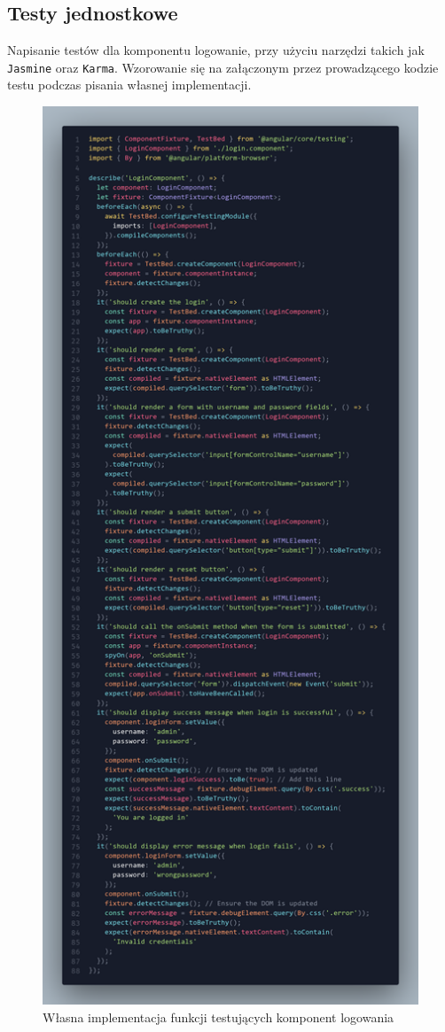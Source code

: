 \documentclass[12pt]{article}
\begin{document}
\pagebreak

\subsection{Testy jednostkowe}
\begin{description}[leftmargin=.5em]
  \item{Napisanie testów dla komponentu logowanie, przy użyciu narzędzi takich jak \texttt{Jasmine} oraz \texttt{Karma}}. Wzorowanie się na załączonym przez prowadzącego kodzie testu podczas pisania własnej implementacji.
\end{description}
\begin{figure}[H]
  \centering
  \includegraphics[height=0.79\textheight,keepaspectratio]{image-9.png}
  \caption{Własna implementacja funkcji testujących komponent logowania}
  \label{fig:image-9}
\end{figure}
\end{document}
